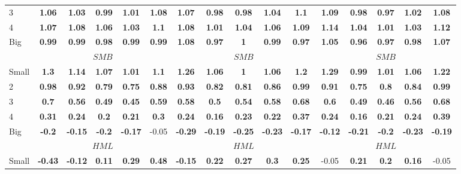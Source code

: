 \begin{table}[H]
\begin{tabular}{lccccc|ccccc|ccccc}
3 & \textbf{1.06} & \textbf{1.03} & \textbf{0.99} & \textbf{1.01} & \textbf{1.08} & \textbf{1.07} & \textbf{0.98} & \textbf{0.98} & \textbf{1.04} & \textbf{1.1} & \textbf{1.09} & \textbf{0.98} & \textbf{0.97} & \textbf{1.02} & \textbf{1.08} \\
4 & \textbf{1.07} & \textbf{1.08} & \textbf{1.06} & \textbf{1.03} & \textbf{1.1} & \textbf{1.08} & \textbf{1.01} & \textbf{1.04} & \textbf{1.06} & \textbf{1.09} & \textbf{1.14} & \textbf{1.04} & \textbf{1.01} & \textbf{1.03} & \textbf{1.12} \\
Big & \textbf{0.99} & \textbf{0.99} & \textbf{0.98} & \textbf{0.99} & \textbf{0.99} & \textbf{1.08} & \textbf{0.97} & \textbf{1} & \textbf{0.99} & \textbf{0.97} & \textbf{1.05} & \textbf{0.96} & \textbf{0.97} & \textbf{0.98} & \textbf{1.07} \\
 & \multicolumn{5}{c|}{$SMB$} & \multicolumn{5}{c|}{$SMB$} & \multicolumn{5}{c}{$SMB$} \\
Small & \textbf{1.3} & \textbf{1.14} & \textbf{1.07} & \textbf{1.01} & \textbf{1.1} & \textbf{1.26} & \textbf{1.06} & \textbf{1} & \textbf{1.06} & \textbf{1.2} & \textbf{1.29} & \textbf{0.99} & \textbf{1.01} & \textbf{1.06} & \textbf{1.22} \\
2 & \textbf{0.98} & \textbf{0.92} & \textbf{0.79} & \textbf{0.75} & \textbf{0.88} & \textbf{0.93} & \textbf{0.82} & \textbf{0.81} & \textbf{0.86} & \textbf{0.99} & \textbf{0.91} & \textbf{0.75} & \textbf{0.8} & \textbf{0.84} & \textbf{0.99} \\
3 & \textbf{0.7} & \textbf{0.56} & \textbf{0.49} & \textbf{0.45} & \textbf{0.59} & \textbf{0.58} & \textbf{0.5} & \textbf{0.54} & \textbf{0.58} & \textbf{0.68} & \textbf{0.6} & \textbf{0.49} & \textbf{0.46} & \textbf{0.56} & \textbf{0.68} \\
4 & \textbf{0.31} & \textbf{0.24} & \textbf{0.2} & \textbf{0.21} & \textbf{0.3} & \textbf{0.24} & \textbf{0.16} & \textbf{0.23} & \textbf{0.22} & \textbf{0.37} & \textbf{0.24} & \textbf{0.16} & \textbf{0.21} & \textbf{0.24} & \textbf{0.39} \\
Big & \textbf{-0.2} & \textbf{-0.15} & \textbf{-0.2} & \textbf{-0.17} & -0.05 & \textbf{-0.29} & \textbf{-0.19} & \textbf{-0.25} & \textbf{-0.23} & \textbf{-0.17} & \textbf{-0.12} & \textbf{-0.21} & \textbf{-0.2} & \textbf{-0.23} & \textbf{-0.19} \\
 & \multicolumn{5}{c|}{$HML$} & \multicolumn{5}{c|}{$HML$} & \multicolumn{5}{c}{$HML$} \\
Small & \textbf{-0.43} & \textbf{-0.12} & \textbf{0.11} & \textbf{0.29} & \textbf{0.48} & \textbf{-0.15} & \textbf{0.22} & \textbf{0.27} & \textbf{0.3} & \textbf{0.25} & -0.05 & \textbf{0.21} & \textbf{0.2} & \textbf{0.16} & -0.05 \\

\end{tabular}
\end{table}
